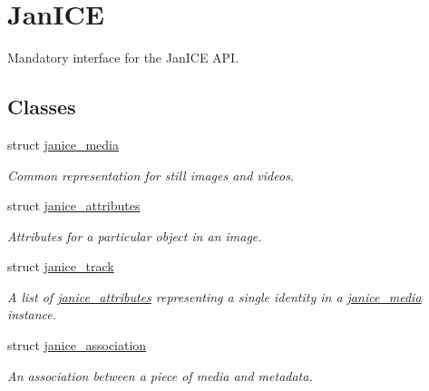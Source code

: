 \hypertarget{group__janice}{}\section{Jan\+I\+C\+E}
\label{group__janice}


Mandatory interface for the Jan\+I\+C\+E A\+P\+I.  


\subsection*{Classes}
\begin{DoxyCompactItemize}
\item 
struct \hyperlink{structjanice__media}{janice\+\_\+media}
\begin{DoxyCompactList}\small\item\em Common representation for still images and videos. \end{DoxyCompactList}\item 
struct \hyperlink{structjanice__attributes}{janice\+\_\+attributes}
\begin{DoxyCompactList}\small\item\em Attributes for a particular object in an image. \end{DoxyCompactList}\item 
struct \hyperlink{structjanice__track}{janice\+\_\+track}
\begin{DoxyCompactList}\small\item\em A list of \hyperlink{structjanice__attributes}{janice\+\_\+attributes} representing a single identity in a \hyperlink{structjanice__media}{janice\+\_\+media} instance. \end{DoxyCompactList}\item 
struct \hyperlink{structjanice__association}{janice\+\_\+association}
\begin{DoxyCompactList}\small\item\em An association between a piece of media and metadata. \end{DoxyCompactList}\end{DoxyCompactItemize}
